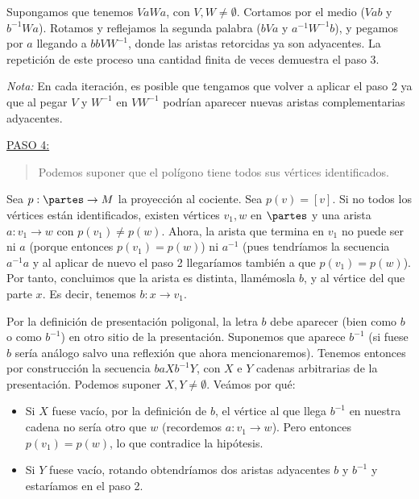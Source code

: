 {    \noindent
    Supongamos que tenemos $VaWa$, con $V,W \ne \emptyset$. Cortamos por el medio ($Vab$ y $b^{-1}Wa$). 
    Rotamos y reflejamos la segunda palabra ($bVa$ y $a^{-1}W^{-1}b$), y pegamos por $a$ llegando a $bbVW^{-1}$, donde las aristas retorcidas ya son adyacentes. 
    La repetición de este proceso una cantidad finita de veces demuestra el paso 3.

    \vspace{0.5em}
    \noindent
    \textit{Nota:} En cada iteración, es posible que tengamos que volver a aplicar el paso 2 ya que al pegar $V$ y $W^{-1}$ en $VW^{-1}$ podrían aparecer nuevas aristas complementarias adyacentes.

    \vspace{1.3em}
    \noindent
    \underline{PASO 4:}
    \begin{quote}
        Podemos suponer que el polígono tiene todos sus vértices identificados.
    \end{quote}

    \noindent
    Sea $p:\partes \to M$ la proyección al cociente. Sea $p(v)=[v]$. 
    Si no todos los vértices están identificados, existen vértices $v_1, w$ en $\partes$ 
    y una arista $ a : v_1 \to w$ con $p(v_1)\ne p(w)$. 
    Ahora, la arista que termina en $v_1$ no puede ser ni $a$ (porque entonces $p(v_1) = p(w)$) 
    ni $a^{-1}$ (pues tendríamos la secuencia $a^{-1} a$ y al aplicar de nuevo el paso 2 llegaríamos también a que $p(v_1) = p(w)$). 
    Por tanto, concluimos que la arista es distinta, llamémosla $b$, y al vértice del que parte $x$. 
    Es decir, tenemos $b : x \to v_1$.

    \vspace{0.5em}
    \noindent
    Por la definición de presentación poligonal, la letra $b$ debe aparecer (bien como $b$ o como $b^{-1}$) en otro sitio de la presentación. 
    Suponemos que aparece $b^{-1}$ (si fuese $b$ sería análogo salvo una reflexión que ahora mencionaremos). 
    Tenemos entonces por construcción la secuencia $baXb^{-1}Y$, con $X$ e $Y$ cadenas arbitrarias de la presentación. Podemos suponer $X,Y \ne \emptyset$. Veámos por qué:
    \begin{itemize}
        \item Si $X$ fuese vacío, por la definición de $b$, el vértice al que llega $b^{-1}$ en nuestra cadena no sería otro que $w$ (recordemos $a:v_1\to w$). 
              Pero entonces $p(v_1) = p(w)$, lo que contradice la hipótesis.
        \item Si $Y$ fuese vacío, rotando obtendríamos dos aristas adyacentes $b$ y $b^{-1}$ y estaríamos en el paso 2.
    \end{itemize}

}
